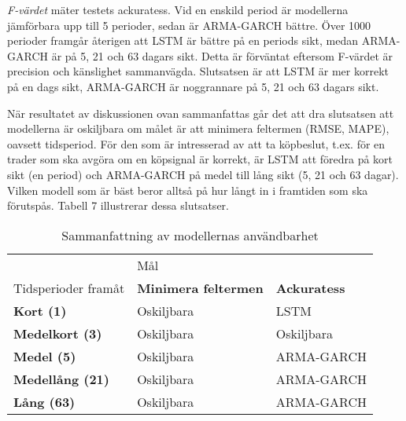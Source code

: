 \documentclass[12pt]{article}
\begin{document}
\par \textit{F-värdet} mäter testets ackuratess. Vid en enskild period är modellerna jämförbara upp till 5 perioder, sedan är ARMA-GARCH bättre. Över 1000 perioder framgår återigen att LSTM är bättre på en periods sikt, medan ARMA-GARCH är på 5, 21 och 63 dagars sikt. Detta är förväntat eftersom F-värdet är precision och känslighet sammanvägda. Slutsatsen är att LSTM är mer korrekt på en dags sikt, ARMA-GARCH är noggrannare på 5, 21 och 63 dagars sikt. 

\par När resultatet av diskussionen ovan sammanfattas går det att dra slutsatsen att modellerna är oskiljbara om målet är att minimera feltermen (RMSE, MAPE), oavsett tidsperiod. För den som är intresserad av att ta köpbeslut, t.ex. för en trader som ska avgöra om en köpsignal är korrekt, är LSTM att föredra på kort sikt (en period) och ARMA-GARCH på medel till lång sikt (5, 21 och 63 dagar). Vilken modell som är bäst beror alltså på hur långt in i framtiden som ska förutspås. Tabell 7 illustrerar dessa slutsatser.

\begin{table}[H]
\caption{Sammanfattning av modellernas användbarhet}
\begin{tabular}{||lll||}
\hline
& \multicolumn{2}{l||}{Mål} \\
Tidsperioder framåt & \textbf{Minimera feltermen} & \textbf{Ackuratess}\\ \hline\hline
{\textbf{Kort (1)}} & Oskiljbara          & LSTM \\ \cline{2-3} 
{\textbf{Medelkort (3)}} & Oskiljbara          & Oskiljbara \\ \cline{2-3} 
{\textbf{Medel (5)}}       & Oskiljbara        & ARMA-GARCH \\ \cline{2-3}
{\textbf{Medellång (21)}}       & Oskiljbara        & ARMA-GARCH \\ \cline{2-3}
{\textbf{Lång (63)}}       & Oskiljbara        & ARMA-GARCH \\
\hline
\end{tabular}
\end{table}
\end{document}
